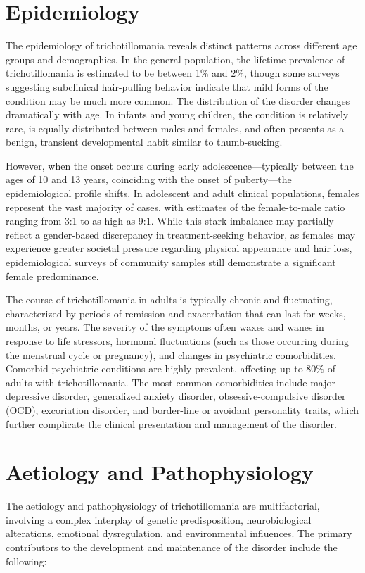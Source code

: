 \section*{Epidemiology}
The epidemiology of trichotillomania reveals distinct patterns across different age groups and demographics. In the general population, the lifetime prevalence of trichotillomania is estimated to be between 1\% and 2\%, though some surveys suggesting subclinical hair-pulling behavior indicate that mild forms of the condition may be much more common. The distribution of the disorder changes dramatically with age. In infants and young children, the condition is relatively rare, is equally distributed between males and females, and often presents as a benign, transient developmental habit similar to thumb-sucking.

However, when the onset occurs during early adolescence---typically between the ages of 10 and 13 years, coinciding with the onset of puberty---the epidemiological profile shifts. In adolescent and adult clinical populations, females represent the vast majority of cases, with estimates of the female-to-male ratio ranging from 3:1 to as high as 9:1. While this stark imbalance may partially reflect a gender-based discrepancy in treatment-seeking behavior, as females may experience greater societal pressure regarding physical appearance and hair loss, epidemiological surveys of community samples still demonstrate a significant female predominance.

The course of trichotillomania in adults is typically chronic and fluctuating, characterized by periods of remission and exacerbation that can last for weeks, months, or years. The severity of the symptoms often waxes and wanes in response to life stressors, hormonal fluctuations (such as those occurring during the menstrual cycle or pregnancy), and changes in psychiatric comorbidities. Comorbid psychiatric conditions are highly prevalent, affecting up to 80\% of adults with trichotillomania. The most common comorbidities include major depressive disorder, generalized anxiety disorder, obsessive-compulsive disorder (OCD), excoriation disorder, and border-line or avoidant personality traits, which further complicate the clinical presentation and management of the disorder.

\section*{Aetiology and Pathophysiology}
The aetiology and pathophysiology of trichotillomania are multifactorial, involving a complex interplay of genetic predisposition, neurobiological alterations, emotional dysregulation, and environmental influences. The primary contributors to the development and maintenance of the disorder include the following:

